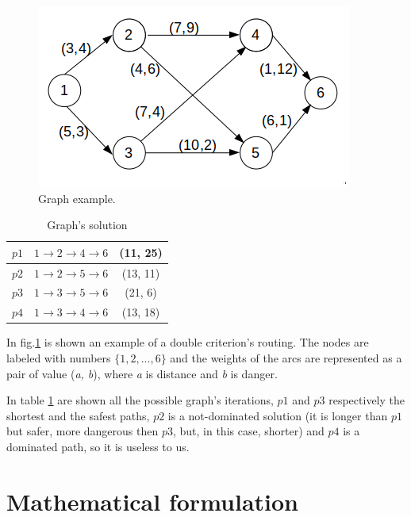 \documentclass[a4paper,11pt]{report}
\begin{document}
\begin{figure}[h]
	\centering
	\includegraphics[width=\linewidth]{img/exampleGraph1}
	\caption{Graph example.}
	\label{fig:graphExample}
\end{figure}

\begin{table}[]
	\centering
	\begin{tabular}{|c|c|c|}
		\hline
		$p1$ & $1\to2\to4\to6$ & (11, 25) \\ \hline
		$p2$ & $1\to2\to5\to6$ & (13, 11)  \\ \hline
		$p3$ & $1\to3\to5\to6$ & (21, 6)  \\ \hline
		$p4$ & $1\to3\to4\to6$ & (13, 18)  \\ \hline
	\end{tabular}
	\caption{Graph's solution}
	\label{tab:graphExample}
\end{table}

In fig.\ref{fig:graphExample} is shown an example of a double criterion's routing. The nodes are labeled with numbers $\{1,2, ..., 6\}$ and the weights of the arcs are represented as a pair of value (\textit{a, b}), where \textit{a} is distance and \textit{b} is danger.

In table \ref{tab:graphExample} are shown all the possible graph's iterations, $p1$ and $p3$ respectively the shortest and the safest paths, $p2$ is a not-dominated solution (it is longer than $p1$ but safer, more dangerous then $p3$, but, in this case, shorter) and $p4$ is a dominated path, so it is useless to us.


 
\section{Mathematical formulation}
\end{document}
